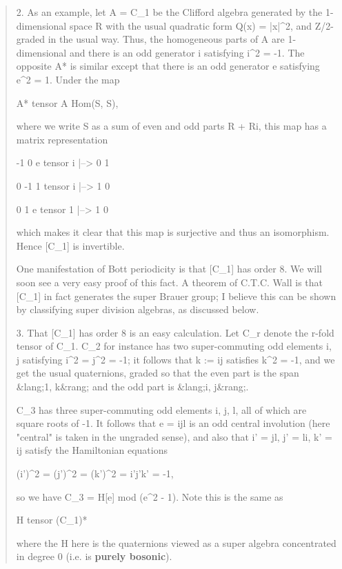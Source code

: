 \begin{quote}
2.  As an example, let  A = C_{1}  be the Clifford algebra 
generated by the 1-dimensional space R with the usual 
quadratic form Q(x) = |x|^{2},  and Z/2-graded in the usual 
way.  Thus, the homogeneous parts of A are 1-dimensional 
and there is an odd generator i satisfying i^{2} = -1.  The 
opposite A* is similar except that there is an odd generator 
e satisfying  e^{2} = 1.  Under the map 

           A* tensor A \to  Hom(S, S), 

where we write S as a sum of even and odd parts R + Ri, 
this map has a matrix representation 

                               -1   0
             e tensor i  |-->   0   1

                                0  -1 
             1 tensor i  |-->   1   0

                                0   1
             e tensor 1  |-->   1   0

which makes it clear that this map is surjective and thus 
an isomorphism.  Hence [C_{1}]  is invertible. 

One manifestation of Bott periodicity is that [C_{1}] 
has order 8.  We will soon see a very easy proof of this 
fact.  A theorem of C.T.C. Wall is that [C_{1}] in fact 
generates the super Brauer group; I believe this can 
be shown by classifying super division algebras, as 
discussed below. 

3. That [C_{1}] has order 8 is an easy calculation.  Let 
C_{r}  denote the r-fold tensor of C_{1}.  C_{2} for instance 
has two super-commuting odd elements  i, j  satisfying 
i^{2} = j^{2} = -1;  it follows that  k := ij  satisfies  
k^{2} = -1, and we get the usual quaternions, graded so that 
the even part is the span  &lang;1, k&rang;  and the odd part is &lang;i, j&rang;. 

C_{3} has three super-commuting odd elements i, j, l, all 
of which are square roots of  -1.  It follows that 
e = ijl is an odd central involution (here "central" 
is taken in the ungraded sense), and also that  
i' = jl,  j' = li,  k' = ij satisfy the Hamiltonian equations 

         (i')^{2} = (j')^{2} = (k')^{2} = i'j'k' = -1, 

so we have  C_{3} = H[e] mod (e^{2} - 1).   Note this is the 
same as 

                 H tensor (C_{1})*

where the H here is the quaternions viewed as a super 
algebra concentrated in degree 0 (i.e. is \textbf{purely bosonic}). 


\end{quote}
